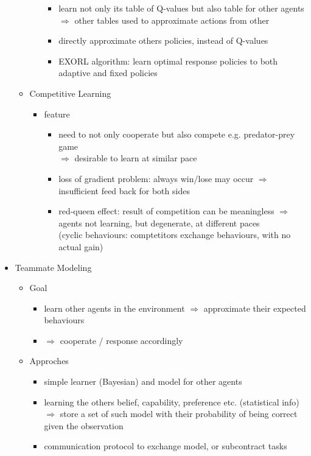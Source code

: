\begin{itemize}
\begin{itemize}
\begin{itemize}
\begin{itemize}
			\item learn not only its table of Q-values but also table for other agents
			$\Rightarrow$ other tables used to approximate actions from other
			\item directly approximate others policies, instead of Q-values
			\item EXORL algorithm: learn optimal response policies to both adaptive and fixed policies
			\end{itemize}
		\end{itemize}
	\item Competitive Learning
		\begin{itemize}
		\item feature
			\begin{itemize}
			\item need to not only cooperate but also compete e.g. predator-prey game \\
			$\Rightarrow$ desirable to learn at similar pace
			\item loss of gradient problem: always win/lose may occur
			$\Rightarrow$ insufficient feed back for both sides
			\item red-queen effect: result of competition can be meaningless 
			$\Rightarrow$ agents not learning, but degenerate, at different paces \\
			(cyclic behaviours: comptetitors exchange behaviours, with no actual gain)
			\end{itemize}
		\end{itemize}
	\end{itemize}
\item Teammate Modeling
	\begin{itemize}
	\item Goal
		\begin{itemize}
		\item learn other agents in the environment $\Rightarrow$ approximate their expected behaviours
		\item $\Rightarrow$ cooperate / response accordingly
		\end{itemize}
	\item Approches
		\begin{itemize}
		\item simple learner (Bayesian) and model for other agents
		\item learning the others belief, capability, preference etc. (statistical info)
		$\Rightarrow$ store a set of such model with their probability of being correct given the observation
		\item communication protocol to exchange model, or subcontract tasks \\

\end{itemize}
\end{itemize}
\end{itemize}
